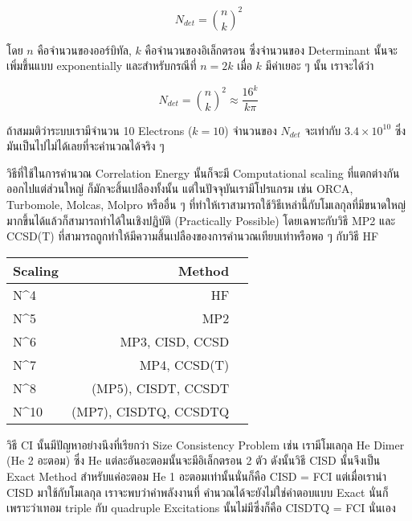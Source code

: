 \begin{equation}
    N_{det} = \binom{n}{k}^{2}
\end{equation}

\noindent โดย $n$ คือจำนวนของออร์บิทัล, $k$ คือจำนวนของอิเล็กตรอน ซึ่งจำนวนของ Determinant
นั้นจะเพิ่มขึ้นแบบ exponentially และสำหรับกรณีที่ $n = 2k$ เมื่อ $k$ มีค่าเยอะ ๆ นั้น เราจะได้ว่า

\begin{equation}
    N_{det} = \binom{n}{k}^{2} \approx \frac{16^k}{k\pi}
\end{equation}

ถ้าสมมติว่าระบบเรามีจำนวน 10 Electrons ($k = 10$) จำนวนของ $N_{det}$ จะเท่ากับ $3.4 \times 10^{10}$
ซึ่งมันเป็นไปไม่ได้เลยที่จะคำนวณได้จริง ๆ

วิธีที่ใช้ในการคำนวณ Correlation Energy นั้นก็จะมี Computational scaling ที่แตกต่างกันออกไปแต่ส่วนใหญ่%
ก็มักจะสิ้นเปลืองทั้งนั้น แต่ในปัจจุบันเรามีโปรแกรม เช่น ORCA, Turbomole, Molcas, Molpro หรืออื่น ๆ
ที่ทำให้เราสามารถใช้วิธีเหล่านี้กับโมเลกุลที่มีขนาดใหญ่มากขึ้นได้แล้วก็สามารถทำได้ในเชิงปฏิบัติ (Practically Possible)
โดยเฉพาะกับวิธี MP2 และ CCSD(T) ที่สามารถถูกทำให้มีความสิ้นเปลืองของการคำนวณเทียบเท่าหรือพอ ๆ กับวิธี HF

\begin{table}[!htp]
    \Large
    \centering
    \begin{tabular}{lrr}\toprule
        Scaling & Method                \\\midrule
        N^4     & HF                    \\
        N^5     & MP2                   \\
        N^6     & MP3, CISD, CCSD       \\
        N^7     & MP4, CCSD(T)          \\
        N^8     & (MP5), CISDT, CCSDT   \\
        N^{10}  & (MP7), CISDTQ, CCSDTQ \\
        \bottomrule
    \end{tabular}
\end{table}

วิธี CI นั้นมีปัญหาอย่างนึงที่เรียกว่า Size Consistency Problem เช่น เรามีโมเลกุล He Dimer (He 2 อะตอม)
ซึ่ง He แต่ละอันอะตอมนั้นจะมีอิเล็กตรอน 2 ตัว ดังนั้นวิธี CISD นั้นจึงเป็น Exact Method สำหรับแค่อะตอม He 1
อะตอมเท่านั้นนั่นก็คือ CISD = FCI แต่เมื่อเรานำ CISD มาใช้กับโมเลกุล  เราจะพบว่าค่าพลังงานที่%
คำนวณได้จะยังไม่ใช่คำตอบแบบ Exact นั่นก็เพราะว่าเทอม triple กับ quadruple Excitations นั้นไม่มีซึ่งก็คือ
CISDTQ = FCI นั่นเอง

